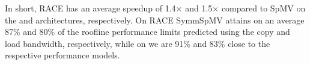 In short, \acrshort{RACE} has an average speedup of 1.4$\times$ and 1.5$\times$ compared to \acrshort{SpMV} on the \SKX and \IVB architectures, respectively. On \SKX \acrshort{RACE} \acrshort{SymmSpMV} attains on an average 87\% and 80\% of the roofline performance limits predicted using the copy and load bandwidth, respectively, while on \IVB we are 91\% and 83\% close to the respective performance models.
%
%
